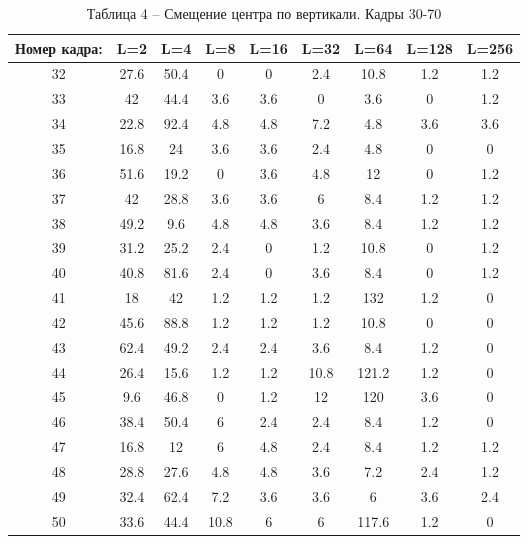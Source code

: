 \newpage
\begin{table}[h!]
\caption*{Таблица 4 -- Смещение центра по вертикали. Кадры 30-70}
\begin{tabular}{|c|c|c|c|c|c|c|c|c|}
\hline
Номер кадра: & L=2   & L=4  & L=8  & L=16  & L=32  & L=64  & L=128 & L=256 \\ \hline
32           & 27.6  & 50.4 & 0    & 0     & 2.4   & 10.8  & 1.2   & 1.2   \\ \hline
33           & 42    & 44.4 & 3.6  & 3.6   & 0     & 3.6   & 0     & 1.2   \\ \hline
34           & 22.8  & 92.4 & 4.8  & 4.8   & 7.2   & 4.8   & 3.6   & 3.6   \\ \hline
35           & 16.8  & 24   & 3.6  & 3.6   & 2.4   & 4.8   & 0     & 0     \\ \hline
36           & 51.6  & 19.2 & 0    & 3.6   & 4.8   & 12    & 0     & 1.2   \\ \hline
37           & 42    & 28.8 & 3.6  & 3.6   & 6     & 8.4   & 1.2   & 1.2   \\ \hline
38           & 49.2  & 9.6  & 4.8  & 4.8   & 3.6   & 8.4   & 1.2   & 1.2   \\ \hline
39           & 31.2  & 25.2 & 2.4  & 0     & 1.2   & 10.8  & 0     & 1.2   \\ \hline
40           & 40.8  & 81.6 & 2.4  & 0     & 3.6   & 8.4   & 0     & 1.2   \\ \hline
41           & 18    & 42   & 1.2  & 1.2   & 1.2   & 132   & 1.2   & 0     \\ \hline
42           & 45.6  & 88.8 & 1.2  & 1.2   & 1.2   & 10.8  & 0     & 0     \\ \hline
43           & 62.4  & 49.2 & 2.4  & 2.4   & 3.6   & 8.4   & 1.2   & 0     \\ \hline
44           & 26.4  & 15.6 & 1.2  & 1.2   & 10.8  & 121.2 & 1.2   & 0     \\ \hline
45           & 9.6   & 46.8 & 0    & 1.2   & 12    & 120   & 3.6   & 0     \\ \hline
46           & 38.4  & 50.4 & 6    & 2.4   & 2.4   & 8.4   & 1.2   & 0     \\ \hline
47           & 16.8  & 12   & 6    & 4.8   & 2.4   & 8.4   & 1.2   & 1.2   \\ \hline
48           & 28.8  & 27.6 & 4.8  & 4.8   & 3.6   & 7.2   & 2.4   & 1.2   \\ \hline
49           & 32.4  & 62.4 & 7.2  & 3.6   & 3.6   & 6     & 3.6   & 2.4   \\ \hline
50           & 33.6  & 44.4 & 10.8 & 6     & 6     & 117.6 & 1.2   & 0     \\ \hline

\end{tabular}
\end{table}
